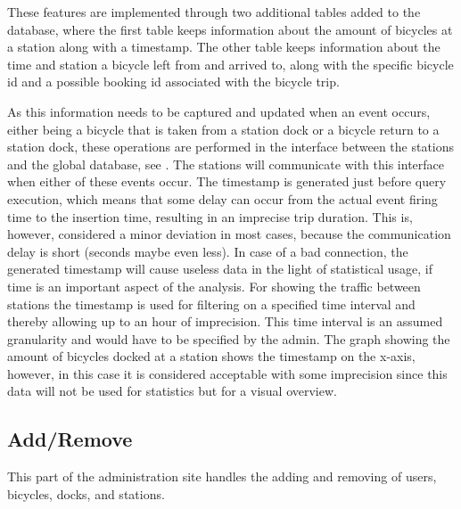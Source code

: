 These features are implemented through two additional tables added to the database, where the first table keeps information about the amount of bicycles at a station along with a timestamp. 
The other table keeps information about the time and station a bicycle left from and arrived to, along with the specific bicycle id and a possible booking id associated with the bicycle trip.

As this information needs to be captured and updated when an event occurs, either being a bicycle that is taken from a station dock or a bicycle return to a station dock, these operations are performed in the interface between the stations and the global database, see . 
The stations will communicate with this interface when either of these events occur. 
The timestamp is generated just before query execution, which means that some delay can occur from the actual event firing time to the insertion time, resulting in an imprecise trip duration. 
This is, however, considered a minor deviation in most cases, because the communication delay is short (seconds maybe even less).
In case of a bad connection, the generated timestamp will cause useless data in the light of statistical usage, if time is an important aspect of the analysis.
For showing the traffic between stations the timestamp is used for filtering on a specified time interval and thereby allowing up to an hour of imprecision.
This time interval is an assumed granularity and would have to be specified by the admin.
The graph showing the amount of bicycles docked at a station shows the timestamp on the x-axis, however, in this case it is considered acceptable with some imprecision since this data will not be used for statistics but for a visual overview.


\subsection{Add/Remove}
This part of the administration site handles the adding and removing of users, bicycles, docks, and stations.

